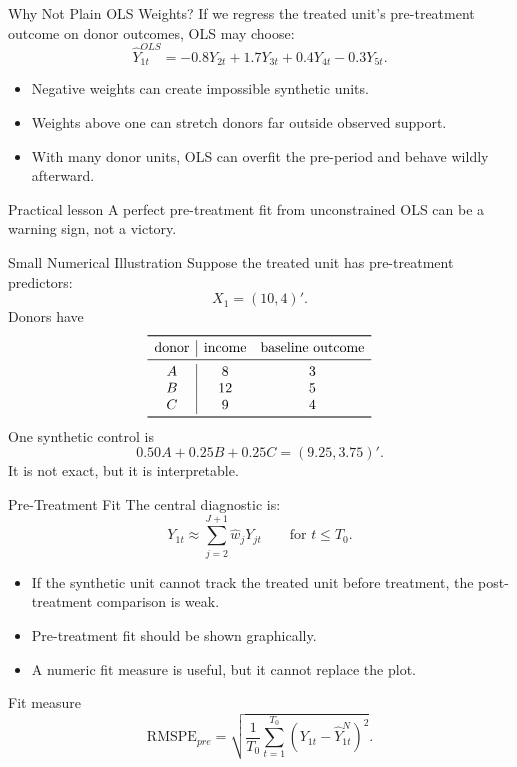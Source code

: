 \documentclass[11pt,aspectratio=169]{beamer}
\newcommand{\RMSPE}{\mathrm{RMSPE}}
\newcommand{\derivbutton}[1]{\vspace{0.4em}\hfill\hyperlink{app:#1}{\beamerbutton{Appendix details}}}
\begin{document}
\begin{frame}{Why Not Plain OLS Weights?}
  If we regress the treated unit's pre-treatment outcome on donor outcomes, OLS may choose:
  \[
    \widehat{Y}_{1t}^{OLS}
    =
    -0.8Y_{2t}+1.7Y_{3t}+0.4Y_{4t}-0.3Y_{5t}.
  \]
  \begin{itemize}
    \item Negative weights can create impossible synthetic units.
    \item Weights above one can stretch donors far outside observed support.
    \item With many donor units, OLS can overfit the pre-period and behave wildly afterward.
  \end{itemize}
  \begin{block}{Practical lesson}
    A perfect pre-treatment fit from unconstrained OLS can be a warning sign, not a victory.
  \end{block}
\end{frame}

\begin{frame}{Small Numerical Illustration}
  Suppose the treated unit has pre-treatment predictors:
  \[
    X_1=(10, 4)'.
  \]
  Donors have
  \[
  \begin{array}{c|cc}
    \toprule
    \text{donor} & \text{income} & \text{baseline outcome}\\
    \midrule
    A & 8 & 3\\
    B & 12 & 5\\
    C & 9 & 4\\
    \bottomrule
  \end{array}
  \]
  One synthetic control is
  \[
    0.50 A + 0.25 B + 0.25 C
    =
    (9.25,3.75)'.
  \]
  It is not exact, but it is interpretable.
\end{frame}

\begin{frame}{Pre-Treatment Fit}
  \hypertarget{main:pretreatment-fit}{}
  \small
  The central diagnostic is:
  \[
    Y_{1t} \approx \sum_{j=2}^{J+1}\widehat{w}_jY_{jt}
    \qquad \text{for } t\leq T_0.
  \]
  \begin{itemize}
    \item If the synthetic unit cannot track the treated unit before treatment, the post-treatment comparison is weak.
    \item Pre-treatment fit should be shown graphically.
    \item A numeric fit measure is useful, but it cannot replace the plot.
  \end{itemize}
  \begin{block}{Fit measure}
    \[
      \RMSPE_{pre}
      =
      \sqrt{\frac{1}{T_0}\sum_{t=1}^{T_0}(Y_{1t}-\widehat{Y}^N_{1t})^2}.
    \]
  \end{block}
  \derivbutton{rmspe}
\end{frame}
\end{document}
